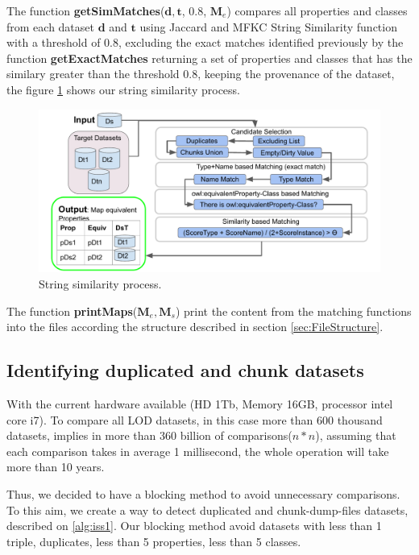 The function \textbf{getSimMatches}($\mathbf{d},\mathbf{t}$, 0.8, $\mathbf{M}_e$) compares all properties and classes from each dataset $\mathbf{d}$ and $\mathbf{t}$ using Jaccard and MFKC\cite{valdestilhas2017high} String Similarity function with a threshold of 0.8, excluding the exact matches identified previously by the function \textbf{getExactMatches} returning a set of properties and classes that has the similary greater than the threshold 0.8, keeping the provenance of the dataset, the figure \ref{fig:simMatch} shows our string similarity process.
\begin{figure}[htb] 
	\centering
	\includegraphics[width=\linewidth]{img/stringSim.pdf}
	\caption{String similarity process.}
	\label{fig:simMatch}
\end{figure}

The function \textbf{printMaps}($\mathbf{M}_e, \mathbf{M}_s$) print the content from the matching functions into the files according the structure described in section \ref{sec:FileStructure}.

\subsection{Identifying duplicated and chunk datasets}
\label{sec:duplicates}
With the current hardware available (HD 1Tb, Memory 16GB, processor intel core i7).
To compare all LOD datasets, in this case more than 600 thousand datasets, implies in more than 360 billion of comparisons($n*n$), assuming that each comparison takes in average 1 millisecond, the whole operation will take more than 10 years.

Thus, we decided to have a blocking method to avoid unnecessary comparisons. To this aim, we create a way to detect duplicated and chunk-dump-files datasets, described on \cref{alg:iss1}. 
Our blocking method avoid datasets with less than 1 triple, duplicates, less than 5 properties, less than 5 classes.

